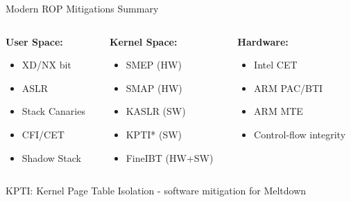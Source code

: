 \documentclass[aspectratio=169,12pt]{beamer}
\begin{document}
\begin{frame}{Modern ROP Mitigations Summary}
    \vspace{0.5cm}
    \begin{columns}
        \begin{column}{0.33\textwidth}
            \textbf{User Space:}
            \begin{itemize}
                \item XD/NX bit
                \item ASLR
                \item Stack Canaries
                \item CFI/CET
                \item Shadow Stack
            \end{itemize}
        \end{column}
        \begin{column}{0.33\textwidth}
            \textbf{Kernel Space:}
            \begin{itemize}
                \item SMEP (HW)
                \item SMAP (HW)
                \item KASLR (SW)
                \item KPTI* (SW)
                \item FineIBT (HW+SW)
            \end{itemize}
        \end{column}
        \begin{column}{0.33\textwidth}
            \textbf{Hardware:}
            \begin{itemize}
                \item Intel CET
                \item ARM PAC/BTI
                \item ARM MTE
                \item Control-flow integrity
            \end{itemize}
        \end{column}
    \end{columns}
    
    \vspace{0.2cm}
    \small *KPTI: Kernel Page Table Isolation - software mitigation for Meltdown
\end{frame}
\end{document}
